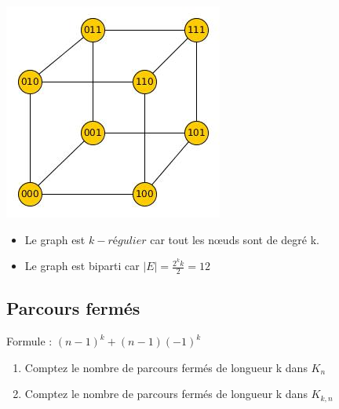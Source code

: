 \begin{solution}
\begin{minipage}{0.35\textwidth}
\begin{flushleft}
\includegraphics[scale=0.4]{graph_ape1_ex3}
\end{flushleft}
\end{minipage}
\begin{minipage}{0.65\textwidth}
\begin{flushright}
\begin{itemize}
\item Le graph est $k-régulier$ car tout les nœuds sont de degré k.
\item Le graph est biparti car $|E| = \frac{2^{k} k}{2} = 12$
\end{itemize}
\end{flushright}
\end{minipage}
\end{solution}

\subsection{Parcours fermés}
Formule : $(n-1)^{k} + (n-1)(-1)^{k}$
\begin{enumerate}
  \item{Comptez le nombre de parcours fermés de longueur k dans $K_{n}$}
  \item{Comptez le nombre de parcours fermés de longueur k dans $K_{k,n}$}
\end{enumerate}

